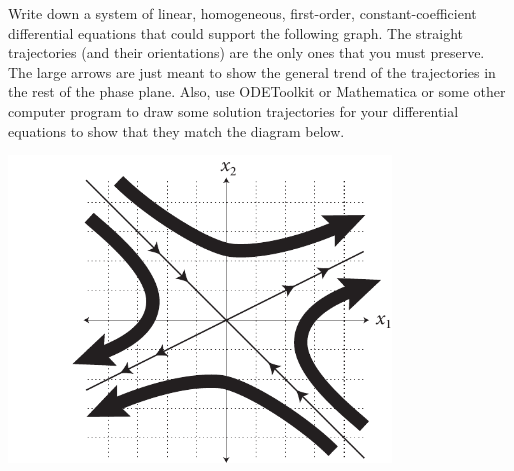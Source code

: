 \documentclass[boxes,printing,blanks,hmc]{gsypset}
\begin{document}
\begin{problem}
	Write down a system of linear, homogeneous, first-order, constant-coefficient 
	differential equations that could support the following graph. 
	The straight trajectories (and their orientations) are the only ones that you must preserve. 
	The large arrows are just meant to show the general trend of the trajectories in the rest of
  the phase plane. 
  Also, use ODEToolkit or Mathematica or some other computer program to draw some solution 
  trajectories for your differential equations to show that they match the diagram below.
  
  \begin{center}
		\includegraphics[width=4in,keepaspectratio=true]{img/hw8phaseplane}
	\end{center}
\end{problem}
\begin{solution}
	
\end{solution}
\end{document}
